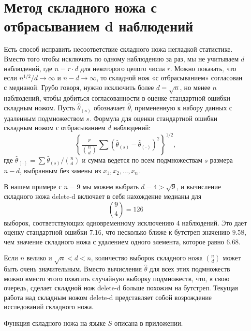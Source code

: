 \section{Метод складного ножа с отбрасыванием d наблюдений}
Есть способ исправить несоответствие складного ножа негладкой статистике. Вместо того чтобы исключать по одному наблюдению за раз, мы не учитываем $d$ наблюдений, где $n = r \cdot d$ для некоторого целого числа $r$. Можно показать, что если $n^{1/2}/d \rightarrow \infty$ и $n-d \rightarrow \infty$, то складной нож «с отбрасыванием» согласован с медианой. Грубо говоря, нужно исключить более $d = \sqrt{n}$, но менее $n$ наблюдений, чтобы добиться согласованности в оценке стандартной ошибки складным ножом. Пусть $\hat{\theta}_{(s)}$ обозначает $\hat{\theta}$, примененную к набору данных с удаленным подмножеством $s$. Формула для оценки стандартной ошибки складным ножом с отбрасыванием $d$ наблюдений:
\begin{equation}\label{eq11.21}
    \left\{\frac{r}{\binom{n}{d}}\sum(\hat{\theta}_{(s)} - \hat{\theta}_{(\cdot)})^2\right\}^{1/2},
\end{equation}
где $\hat{\theta}_{(\cdot)} = \sum\hat{\theta}_{(s)}/\binom{n}{d}$ и сумма ведется по всем подмножествам $s$ размера $n - d$, выбранным без замены из $x_1, x_2, \dots, x_n$.

В нашем примере с $n = 9$ мы можем выбрать $d = 4> \sqrt{9}$, и вычисление складного ножа delete-d включает в себя нахождение медианы для
\begin{equation}\label{eq11.22}
    \binom{9}{4} = 126
\end{equation}
выборок, соответствующих одновременному исключению $4$ наблюдений. Это дает оценку стандартной ошибки $7.16$, что несколько ближе к бутстреп значению $9.58$, чем значение складного ножа с удалением одного элемента, которое равно $6.68$.

Если $n$ велико и $\sqrt{n} < d < n$, количество выборок складного ножа $\binom{n}{d}$ может быть очень значительным. Вместо вычисления $\hat{\theta}$ для всех этих подмножеств можно вместо этого охватить случайную выборку подмножеств, что, в свою очередь, сделает складной нож delete-d больше похожим на бутстреп. Текущая работа над складным ножом delete-d представляет собой возрождение исследований складного ножа.

Функция складного ножа на языке $S$ описана в приложении.